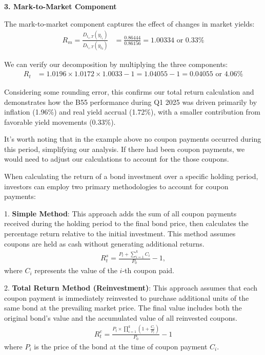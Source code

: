 \documentclass[10pt]{report}
\begin{document}
{\begin{minipage}{0.85\textwidth}
		\textbf{3. Mark-to-Market Component}

		The mark-to-market component captures the effect of changes in market yields:
		\begin{align*}
			R_{m} = \frac{D_{t_1,T}(y_{t_1})}{D_{t_1,T}(y_{t_0})} & = \frac{0.86444}{0.86156}
			= 1.00334 \text{ or } 0.33\%
		\end{align*}
		\vspace{0.25cm}

		We can verify our decomposition by multiplying the three components:
		\begin{align*}
			R_t & = 1.0196 \times 1.0172 \times 1.0033 - 1
			= 1.04055 - 1
			= 0.04055 \text{ or } 4.06\%
		\end{align*}

		Considering some rounding error, this confirms our total return calculation and demonstrates how the B55 performance during Q1 2025 was driven primarily by inflation (1.96\%) and real yield accrual (1.72\%), with a smaller contribution from favorable yield movements (0.33\%).
	\end{minipage}
}

It's worth noting that in the example above no coupon payments occurred during this period, simplifying our analysis. If there had been coupon payments, we would need to adjust our calculations to account for the those coupons.

When calculating the return of a bond investment over a specific holding period, investors can employ two primary methodologies to account for coupon payments:

1. \textbf{Simple Method}: This approach adds the sum of all coupon payments received during the holding period to the final bond price, then calculates the percentage return relative to the initial investment. This method assumes coupons are held as cash without generating additional returns.
\begin{align}
	R_{t}^ {s}  = \frac{P_{t} + \sum_{i=1}^{k} C_i}{P_{0}} - 1,
\end{align}
where $C_i$ represents the value of the $i$-th coupon paid.

2. \textbf{Total Return Method (Reinvestment)}: This approach assumes that each coupon payment is immediately reinvested to purchase additional units of the same bond at the prevailing market price. The final value includes both the original bond's value and the accumulated value of all reinvested coupons.
\begin{align}
	R_{t}^{c} = \frac{P_{t} \times \prod_{i=1}^{k} \left(1 + \frac{C_i}{P_i}\right)}{P_0} - 1
\end{align}
where $P_{i}$ is the price of the bond at the time of coupon payment $C_i$.
\end{document}
